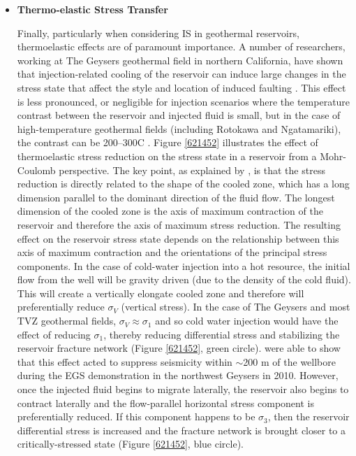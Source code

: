 \begin{itemize}
  \item{\textbf{Thermo-elastic Stress Transfer}}
  
  Finally, particularly when considering IS in geothermal reservoirs, thermoelastic effects are of paramount importance. A number of researchers, working at The Geysers geothermal field in northern California, have shown that injection-related cooling of the reservoir can induce large changes in the stress state that affect the style and location of induced faulting \citep{Mart_nez_Garz_n_2014,Mart_nez_Garz_n_2013,Mart_nez_Garz_n_2017,Jeanne_2014,Jeanne_2015tensor}. This effect is less pronounced, or negligible for injection scenarios where the temperature contrast between the reservoir and injected fluid is small, but in the case of high-temperature geothermal fields (including Rotokawa and Ngatamariki), the contrast can be 200--300\textdegree C \citep[e.g.][]{Mart_nez_Garz_n_2014,Jeanne_2015tensor}. Figure \ref{621452} illustrates the effect of thermoelastic stress reduction on the stress state in a reservoir from a Mohr-Coulomb perspective. The key point, as explained by \citet{Jeanne_2014,Jeanne_2015tensor}, is that the stress reduction is directly related to the shape of the cooled zone, which has a long dimension parallel to the dominant direction of the fluid flow. The longest dimension of the cooled zone is the axis of maximum contraction of the reservoir and therefore the axis of maximum stress reduction. The resulting effect on the reservoir stress state depends on the relationship between this axis of maximum contraction and the orientations of the principal stress components. In the case of cold-water injection into a hot resource, the initial flow from the well will be gravity driven (due to the density of the cold fluid). This will create a vertically elongate cooled zone and therefore will preferentially reduce $\sigma_{V}$ (vertical stress). In the case of The Geysers and most \acrshort{TVZ} geothermal fields, $\sigma_{V}\approx{}\sigma_{1}$ and so cold water injection would have the effect of reducing $\sigma_{1}$, thereby reducing differential stress and stabilizing the reservoir fracture network (Figure \ref{621452}, green circle). \citet{Jeanne_2014} were able to show that this effect acted to suppress seismicity within $\sim$200 m of the wellbore during the EGS demonstration in the northwest Geysers in 2010. However, once the injected fluid begins to migrate laterally, the reservoir also begins to contract laterally and the flow-parallel horizontal stress component is preferentially reduced. If this component happens to be $\sigma_{3}$, then the reservoir differential stress is increased and the fracture network is brought closer to a critically-stressed state (Figure \ref{621452}, blue circle).
\end{itemize}

